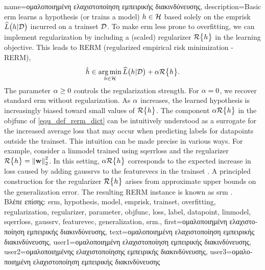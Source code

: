 {name={\foreignlanguage{greek}{ομαλοποιημένη ελαχιστοποίηση εμπειρικής διακινδύνευσης}}, 
	description={Basic \gls{erm} learns a \gls{hypothesis} (or trains a \gls{model}) $h \in \mathcal{H}$ 
		based solely on the \gls{emprisk} $\widehat{L}\big(h|\mathcal{D}\big)$ incurred on a \gls{trainset} $\mathcal{D}$. 
		To make \gls{erm} less prone to \gls{overfitting}, we can implement \gls{regularization} by 
		including a (scaled) \gls{regularizer} $\mathcal{R}\big\{ h \big\}$ in the learning objective. 
		This leads to RERM 
		(regularized empirical risk minimization - RERM), 
		\begin{equation}
			\label{equ_def_rerm_dict}
			\hat{h} \in \operatorname*{arg\,min}_{h \in \mathcal{H}} \widehat{L}\big(h|\mathcal{D}\big) + \alpha \mathcal{R}\big\{ h \big\}.
		\end{equation}
		The \gls{parameter} $\alpha \geq 0$ controls the \gls{regularization} strength. 
		For $\alpha = 0$, we recover standard \gls{erm} without \gls{regularization}. As $\alpha$ increases, the 
		learned \gls{hypothesis} is increasingly biased toward small values of $\mathcal{R}\big\{ h \big\}$. 
		The component $\alpha \mathcal{R}\big\{ h \big\}$ in the \gls{objfunc} of \eqref{equ_def_rerm_dict} 
		can be intuitively understood as a surrogate for the increased average \gls{loss} that may 
		occur when predicting \gls{label}s for \gls{datapoint}s outside the \gls{trainset}. This intuition  
		can be made precise in various ways. For example, consider a \gls{linmodel} trained using \gls{sqerrloss} 
		and the \gls{regularizer} $\mathcal{R}\big\{ h \big\} = \left\Vert {{\bf w}} \right\Vert_{2}^{2}$. 
		In this setting, $\alpha \mathcal{R}\big\{ h \big\}$ corresponds to the expected increase in \gls{loss} 
		caused by adding \gls{gaussrv}s to the \gls{featurevec}s in the \gls{trainset} 
		\cite[Ch. 3]{MLBasics}.
		A principled construction for the \gls{regularizer} $\mathcal{R}\big\{ h \big\}$ 
		arises from approximate upper bounds on the \gls{generalization} error. The resulting 
		RERM instance is known as \gls{srm} \cite[Sec. 7.2]{ShalevShwartz2009}.\\
		\foreignlanguage{greek}{Βλέπε επίσης:} \gls{erm}, \gls{hypothesis}, \gls{model}, \gls{emprisk}, \gls{trainset}, \gls{overfitting}, 
		\gls{regularization}, \gls{regularizer}, \gls{parameter}, \gls{objfunc}, \gls{loss}, \gls{label}, \gls{datapoint}, \gls{linmodel}, \gls{sqerrloss}, 
		\gls{gaussrv}, \gls{featurevec}, \gls{generalization}, \gls{srm}.}, 
	first={\foreignlanguage{greek}{ομαλοποιημένη ελαχιστοποίηση εμπειρικής διακινδύνευσης}},
	text={\foreignlanguage{greek}{ομαλοποιημένη ελαχιστοποίηση εμπειρικής διακινδύνευσης}}, 
	user1={\foreignlanguage{greek}{ομαλοποιημένη ελαχιστοποίηση εμπειρικής διακινδύνευσης}}, %
  	user2={\foreignlanguage{greek}{ομαλοποιημένης ελαχιστοποίησης εμπειρικής διακινδύνευσης}}, %
	user3={\foreignlanguage{greek}{ομαλοποιημένη ελαχιστοποίηση εμπειρικής διακινδύνευσης}} %
}

